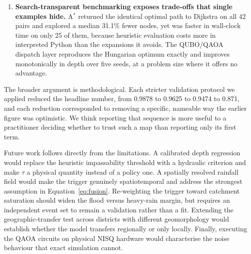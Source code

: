 \documentclass[11pt,a4paper]{article}
\begin{document}
\begin{enumerate}
      pairs at $\tau\ge0.65$, $0.55$--$0.60$ and $\le0.50$. $\tau$ should be set
      by policy on acceptable risk, not by convention (RQ3).
\item \textbf{Search-transparent benchmarking exposes trade-offs that single
      examples hide.} A$^\ast$ returned the identical optimal path to Dijkstra on
      all 42 pairs and explored a median 31.1\% fewer nodes, yet was faster in
      wall-clock time on only 25 of them, because heuristic evaluation costs more
      in interpreted Python than the expansions it avoids. The QUBO/QAOA dispatch
      layer reproduces the Hungarian optimum exactly and improves monotonically
      in depth over five seeds, at a problem size where it offers no advantage.
\end{enumerate}

The broader argument is methodological. Each stricter validation protocol we
applied reduced the headline number, from 0.9878 to 0.9625 to 0.9474 to 0.871, and
each reduction corresponded to removing a specific, nameable way the earlier
figure was optimistic. We think reporting that sequence is more useful to a
practitioner deciding whether to trust such a map than reporting only its first
term.

Future work follows directly from the limitations. A calibrated depth regression
would replace the heuristic impassability threshold with a hydraulic criterion
and make $\tau$ a physical quantity instead of a policy one. A spatially
resolved rainfall field would make the trigger genuinely spatiotemporal and
address the strongest assumption in Equation~\eqref{eq:fusion}. Re-weighting the
trigger toward catchment saturation should widen the flood versus heavy-rain
margin, but requires an independent event set to remain a validation rather than
a fit. Extending the geographic-transfer test across districts with different
geomorphology would establish whether the model transfers regionally or only
locally. Finally, executing the QAOA circuits on physical NISQ hardware would
characterise the noise behaviour that exact simulation cannot.

\end{document}
